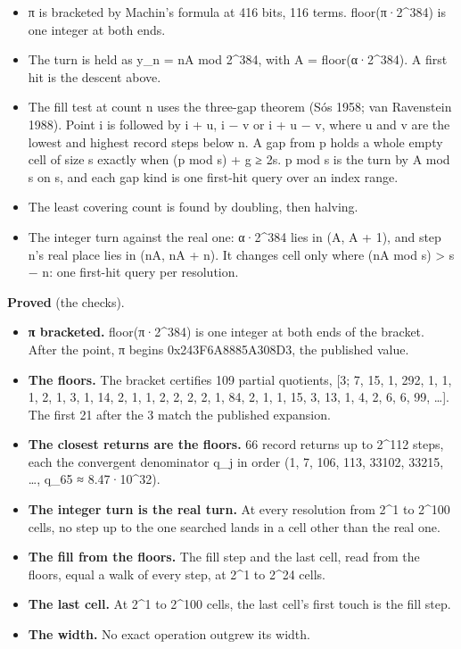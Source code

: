 \begin{itemize}
\item π is bracketed by Machin's formula at 416 bits, 116 terms. floor(π·2\textasciicircum{}384) is one integer at both ends.
\item The turn is held as y\_\allowbreak{}n = nA mod 2\textasciicircum{}384, with A = floor(α·2\textasciicircum{}384). A first hit is the descent above.
\item The fill test at count n uses the three-gap theorem (Sós 1958; van Ravenstein 1988). Point i is followed by i + u, i − v or i + u − v, where u and v are the lowest and highest record steps below n. A gap from p holds a whole empty cell of size s exactly when (p mod s) + g ≥ 2s. p mod s is the turn by A mod s on s, and each gap kind is one first-hit query over an index range.
\item The least covering count is found by doubling, then halving.
\item The integer turn against the real one: α·2\textasciicircum{}384 lies in (A, A + 1), and step n's real place lies in (nA, nA + n). It changes cell only where (nA mod s) > s − n: one first-hit query per resolution.
\end{itemize}

\textbf{Proved} (the checks).

\begin{itemize}
\item \textbf{π bracketed.} floor(π·2\textasciicircum{}384) is one integer at both ends of the bracket. After the point, π begins 0x243F6A8885A308D3, the published value.
\item \textbf{The floors.} The bracket certifies 109 partial quotients, [3; 7, 15, 1, 292, 1, 1, 1, 2, 1, 3, 1, 14, 2, 1, 1, 2, 2, 2, 2, 1, 84, 2, 1, 1, 15, 3, 13, 1, 4, 2, 6, 6, 99, …]. The first 21 after the 3 match the published expansion.
\item \textbf{The closest returns are the floors.} 66 record returns up to 2\textasciicircum{}112 steps, each the convergent denominator q\_\allowbreak{}j in order (1, 7, 106, 113, 33102, 33215, …, q\_\allowbreak{}65 ≈ 8.47·10\textasciicircum{}32).
\item \textbf{The integer turn is the real turn.} At every resolution from 2\textasciicircum{}1 to 2\textasciicircum{}100 cells, no step up to the one searched lands in a cell other than the real one.
\item \textbf{The fill from the floors.} The fill step and the last cell, read from the floors, equal a walk of every step, at 2\textasciicircum{}1 to 2\textasciicircum{}24 cells.
\item \textbf{The last cell.} At 2\textasciicircum{}1 to 2\textasciicircum{}100 cells, the last cell's first touch is the fill step.
\item \textbf{The width.} No exact operation outgrew its width.
\end{itemize}

